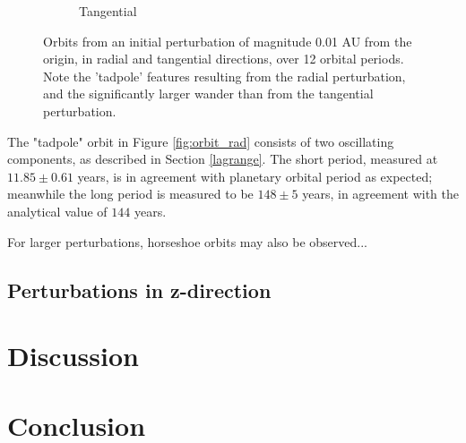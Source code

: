 \documentclass[11pt, a4paper,twocolumn]{article} %
\begin{document}
\begin{figure}[ht]
\begin{subfigure}{.23\textwidth}
		\caption{Tangential}
		\label{fig:orbit_tan}
	\end{subfigure}
	\caption{Orbits from an initial perturbation of magnitude 0.01 AU from the origin, in radial and tangential directions, over 12 orbital periods. Note the 'tadpole' features resulting from the radial perturbation, and the significantly larger wander than from the tangential perturbation.}
	\label{fig:orbitplots}
\end{figure}


 
The "tadpole" orbit in Figure \ref{fig:orbit_rad} consists of two oscillating components, as described in Section \ref{lagrange}. The short period, measured at $11.85 \pm 0.61$ years, is in agreement with  planetary orbital period as expected; meanwhile the long period is measured to be $148 \pm 5$ years, in agreement with the analytical value of $144$ years.

For larger perturbations, horseshoe orbits may also be observed...



\subsection{Perturbations in z-direction}

\section{Discussion}
\section{Conclusion}




\clearpage
\printbibliography
\end{document}

